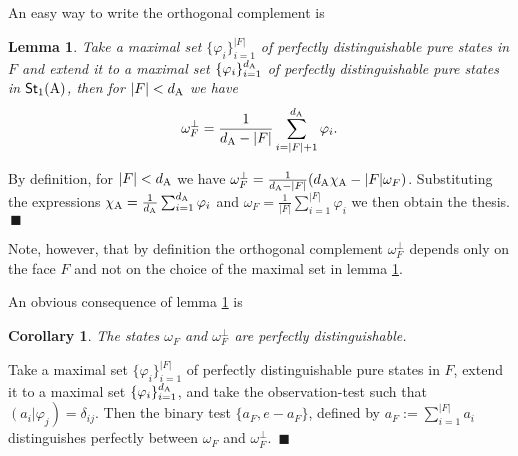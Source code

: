 \documentclass[12pt,aps,pra,showpacs,groupedaddress]{revtex4-1}
\newtheorem{lemma}{Lemma} \newtheorem{proposition}{Proposition}
\newtheorem{corollary}{Corollary} \newtheorem{theorem}{Theorem}
\def\Proof{\medskip\par\noindent{\bf Proof. }}
\def\qed{$\,\blacksquare$\par}
\def\Stset{{\mathsf{St}}}
\def\SC#1#2{\left(#1\right|\left.\!#2\right)}  \def\Tr{{\rm Tr}}
\begin{document}
An easy way to write the orthogonal complement is 
\begin{lemma}\label{lem:concretecomplement}
  Take a maximal set $\{\varphi_i\}_{i=1}^{|F|}$ of perfectly distinguishable pure states in $F$ and
  extend it to a maximal set $\{\varphi_i\}_{i=1}^{d_{\rm A}}$ of perfectly distinguishable pure states
  in $\Stset_1 (\rA)$, then for $|F| < d_{\rm A}$ we have
\begin{equation*}
\omega_F^\perp  = \frac 1 {d_\rA - |F|}  \sum_{i=|F| +1}^{d_\rA}  \varphi_i.
\end{equation*}  
\end{lemma}
\Proof By definition, for $|F| <d_{\rm A}$ we have $\omega_F^\perp = \frac 1 {d_{\rm A} -|F|} ( d_{\rm A}
\chi_{\rm A} - |F| \omega_F ) $.  Substituting the expressions $\chi_{\rm A} = \frac 1 {d_{\rm A}}
\sum_{i=1}^{d_{\rm A}} \varphi_i$ and $\omega_F = \frac 1 {|F|} \sum_{i=1}^{|F| }\varphi_i$ we then
obtain the thesis. \qed Note, however, that by definition the orthogonal complement
$\omega_F^{\perp}$ depends only on the face $F$ and not on the choice of the maximal set in lemma
\ref{lem:concretecomplement}.

An obvious consequence of lemma \ref{lem:concretecomplement} is 
\begin{corollary}\label{cor:obvious}
The states $\omega_F$ and  $\omega_F^\perp$ are perfectly distinguishable. 
\end{corollary}
\Proof Take a maximal set $\{\varphi_i\}_{i=1}^{|F|}$ of perfectly distinguishable pure states in
$F$, extend it to a maximal set $\{\varphi_i\}_{i=1}^{d_{\rm A}}$, and take the observation-test such
that $\SC {a_i} {\varphi_j} = \delta_{ij}$.  Then the binary test $\{a_F, e-a_F\}$, defined by
$a_F:= \sum_{i=1}^{|F|} a_i$ distinguishes perfectly between $\omega_F$ and $\omega_F^\perp$. \qed
\end{document}
